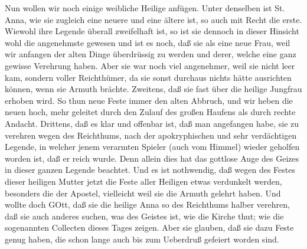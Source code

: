 Nun wollen wir noch einige weibliche Heilige anfügen. Unter denselben ist St. Anna, wie sie zugleich eine neuere und eine ältere ist, so auch mit Recht die erste. Wiewohl ihre Legende überall zweifelhaft ist, so ist sie dennoch in dieser Hinsicht wohl die angenehmste gewesen und ist es noch, daß sie als eine neue Frau, weil wir anfangen der alten Dinge überdrüssig zu werden und derer, welche eine ganz gewisse Verehrung haben. Aber sie war noch viel angenehmer, weil sie nicht leer kam, sondern voller Reichthümer, da sie sonst durchaus nichts hätte ausrichten können, wenn sie Armuth brächte. Zweitens, daß sie fast über die heilige Jungfrau erhoben wird. So thun neue Feste immer den alten Abbruch, und wir heben die neuen hoch, mehr geleitet durch den Zulauf des großen Haufens als durch rechte Andacht. Drittens, daß es klar und offenbar ist, daß man angefangen habe, sie zu verehren wegen des Reichthums, nach der apokryphischen und sehr verdächtigen Legende, in welcher jenem verarmten Spieler (auch vom Himmel) wieder geholfen worden ist, daß er reich wurde. Denn allein dies hat das gottlose Auge des Geizes in dieser ganzen Legende beachtet. Und es ist nothwendig, daß wegen des Festes dieser heiligen Mutter jetzt die Feste aller Heiligen etwas verdunkelt werden, besonders die der Apostel, vielleicht weil sie die Armuth gelehrt haben. Und wollte doch GOtt, daß sie
die heilige Anna so des Reichthums halber verehren, daß sie auch anderes suchen, was des Geistes ist, wie die Kirche thut; wie die sogenannten Collecten dieses Tages zeigen. Aber sie glauben, daß sie dazu Feste genug haben, die schon lange auch bis zum Ueberdruß gefeiert worden sind.

